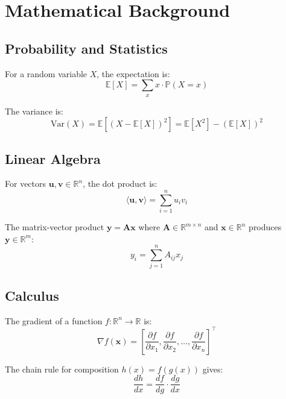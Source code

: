 \documentclass[10pt]{article}
\newcommand{\RR}{\mathbb{R}}
\newcommand{\EE}{\mathbb{E}}
\newcommand{\PP}{\mathbb{P}}
\newcommand{\VarOp}{\mathrm{Var}}
\newcommand{\prob}[1]{\PP\left(#1\right)}
\begin{document}
\appendix

\section{Mathematical Background}

\subsection{Probability and Statistics}

For a random variable $X$, the expectation is:
\[
\EE[X] = \sum_x x \cdot \prob{X=x}
\]

The variance is:
\[
\VarOp(X) = \EE[(X - \EE[X])^2] = \EE[X^2] - (\EE[X])^2
\]

\subsection{Linear Algebra}

For vectors $\mathbf{u}, \mathbf{v} \in \RR^n$, the dot product is:
\[
\langle \mathbf{u}, \mathbf{v} \rangle = \sum_{i=1}^n u_i v_i
\]

The matrix-vector product $\mathbf{y} = \mathbf{A}\mathbf{x}$ where $\mathbf{A} \in \RR^{m \times n}$ and $\mathbf{x} \in \RR^n$ produces $\mathbf{y} \in \RR^m$:
\[
y_i = \sum_{j=1}^n A_{ij} x_j
\]

\subsection{Calculus}

The gradient of a function $f: \RR^n \to \RR$ is:
\[
\nabla f(\mathbf{x}) = \left[\frac{\partial f}{\partial x_1}, \frac{\partial f}{\partial x_2}, \ldots, \frac{\partial f}{\partial x_n}\right]^\top
\]

The chain rule for composition $h(x) = f(g(x))$ gives:
\[
\frac{dh}{dx} = \frac{df}{dg} \cdot \frac{dg}{dx}
\]
\end{document}
